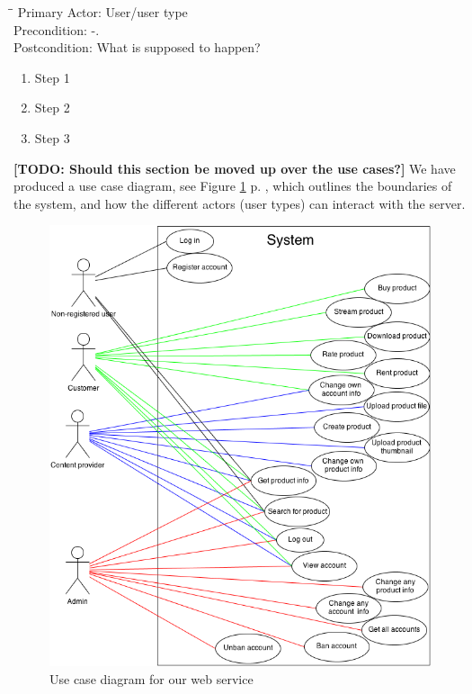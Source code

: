 \begin{tabbing}
\hspace{5mm}\=\hspace{26mm}\=\kill
\>Primary Actor:\> User/user type\\
\>Precondition:\> -.\\
\>Postcondition:\> What is supposed to happen?
\end{tabbing}
\begin{enumerate}
	\item Step 1
	\item Step 2
	\item Step 3
\end{enumerate}
\vspace{3mm}

\textbf{[TODO: Should this section be moved up over the use cases?]}
We have produced a use case diagram, see Figure \ref{useCaseImg} p. \pageref{useCaseImg}, which outlines the boundaries of the system, and how the different actors (user types) can interact with the server. 
\begin{figure}[h]
\centering
\includegraphics[scale=0.5]{illustrations/UseCaseDiagram.png}
\caption{Use case diagram for our web service}
\label{useCaseImg}
\end{figure}